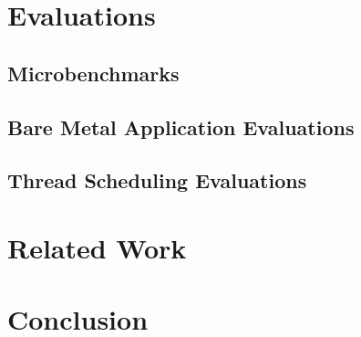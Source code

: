 \section{Evaluations}

\subsection{Microbenchmarks}

\subsection{Bare Metal Application Evaluations}

\subsection{Thread Scheduling Evaluations}

\section{Related Work}

\section{Conclusion}


